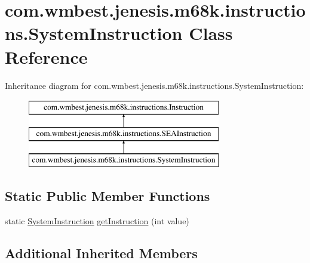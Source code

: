 \hypertarget{classcom_1_1wmbest_1_1jenesis_1_1m68k_1_1instructions_1_1SystemInstruction}{\section{com.\-wmbest.\-jenesis.\-m68k.\-instructions.\-System\-Instruction Class Reference}
\label{classcom_1_1wmbest_1_1jenesis_1_1m68k_1_1instructions_1_1SystemInstruction}
}
Inheritance diagram for com.\-wmbest.\-jenesis.\-m68k.\-instructions.\-System\-Instruction\-:\begin{figure}[H]
\begin{center}
\leavevmode
\includegraphics[height=3.000000cm]{classcom_1_1wmbest_1_1jenesis_1_1m68k_1_1instructions_1_1SystemInstruction}
\end{center}
\end{figure}
\subsection*{Static Public Member Functions}
\begin{DoxyCompactItemize}
\item 
static \hyperlink{classcom_1_1wmbest_1_1jenesis_1_1m68k_1_1instructions_1_1SystemInstruction}{System\-Instruction} \hyperlink{classcom_1_1wmbest_1_1jenesis_1_1m68k_1_1instructions_1_1SystemInstruction_a3a02281c96164bd836be2eca75873c07}{get\-Instruction} (int value)
\end{DoxyCompactItemize}
\subsection*{Additional Inherited Members}


